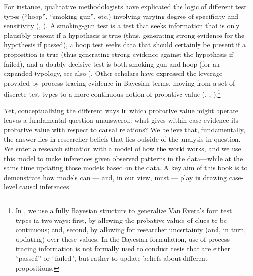 \documentclass[
  12pt,
]{book}
\begin{document}
For instance, qualitative methodologists have explicated the logic of different test types (``hoop'', ``smoking gun'', etc.) involving varying degree of specificity and sensitivity (\citet{collier2011understanding}, \citet{Mahony:Logic:2012}). A smoking-gun test is a test that seeks information that is only plausibly present if a hypothesis is true (thus, generating strong evidence for the hypothesis if passed), a hoop test seeks data that should certainly be present if a proposition is true (thus generating strong evidence against the hypothesis if failed), and a doubly decisive test is both smoking-gun and hoop (for an expanded typology, see also \citet{rohlfing2013comparative}). Other scholars have expressed the leverage provided by process-tracing evidence in Bayesian terms, moving from a set of discrete test types to a more continuous notion of probative value (\citet{fairfield2017explicit}, \citet{BennettAppendix}, \citet{humphreys2015mixing}).\footnote{In \citet{humphreys2015mixing}, we use a fully Bayesian structure to generalize Van Evera's four test types in two ways: first, by allowing the probative values of clues to be continuous; and, second, by allowing for researcher uncertainty (and, in turn, updating) over these values. In the Bayesian formulation, use of process-tracing information is not formally used to conduct tests that are either ``passed'' or ``failed'', but rather to update beliefs about different propositions.}

Yet, conceptualizing the different ways in which probative value might operate leaves a fundamental question unanswered: what gives within-case evidence its probative value with respect to causal relations? We believe that, fundamentally, the answer lies in researcher beliefs that lies outside of the analysis in question. We enter a research situation with a model of how the world works, and we use this model to make inferences given observed patterns in the data---while at the same time updating those models based on the data. A key aim of this book is to demonstrate how models can --- and, in our view, must --- play in drawing case-level causal inferences.
\end{document}
